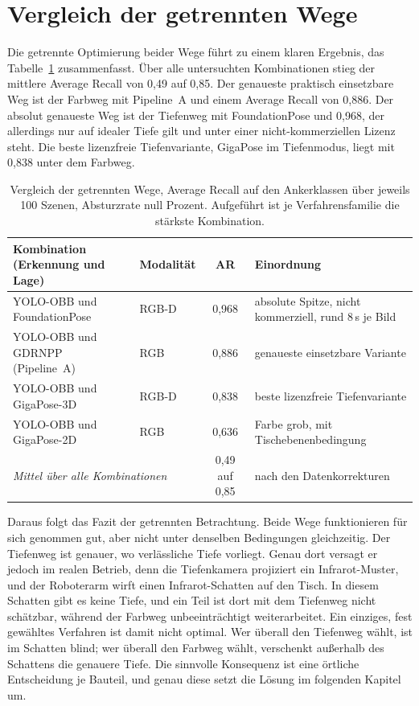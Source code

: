 \documentclass[oneside,studentpaper]{wbk}
\begin{document}
\section{Vergleich der getrennten Wege}
\label{sec:vergleich}

Die getrennte Optimierung beider Wege führt zu einem klaren Ergebnis, das
Tabelle~\ref{tab:getrennt} zusammenfasst. Über alle untersuchten Kombinationen
stieg der mittlere Average Recall von 0,49 auf 0,85. Der genaueste praktisch
einsetzbare Weg ist der Farbweg mit Pipeline~A und einem Average Recall von 0,886.
Der absolut genaueste Weg ist der Tiefenweg mit FoundationPose und 0,968, der
allerdings nur auf idealer Tiefe gilt und unter einer nicht-kommerziellen Lizenz
steht. Die beste lizenzfreie Tiefenvariante, GigaPose im Tiefenmodus, liegt mit
0,838 unter dem Farbweg.

\begin{table}[H]
\caption{Vergleich der getrennten Wege, Average Recall auf den Ankerklassen über
jeweils 100 Szenen, Absturzrate null Prozent. Aufgeführt ist je Verfahrensfamilie
die stärkste Kombination.}
\label{tab:getrennt}
\centering
\small
\begin{tabularx}{\textwidth}{l l c X}
\toprule
\textbf{Kombination (Erkennung und Lage)} & \textbf{Modalität} & \textbf{AR} & \textbf{Einordnung} \\
\midrule
YOLO-OBB und FoundationPose & RGB-D & 0,968 & absolute Spitze, nicht kommerziell, rund 8\,s je Bild \\
YOLO-OBB und GDRNPP (Pipeline~A) & RGB & 0,886 & genaueste einsetzbare Variante \\
YOLO-OBB und GigaPose-3D & RGB-D & 0,838 & beste lizenzfreie Tiefenvariante \\
YOLO-OBB und GigaPose-2D & RGB & 0,636 & Farbe grob, mit Tischebenenbedingung \\
\midrule
\multicolumn{2}{l}{\textit{Mittel über alle Kombinationen}} & 0,49 auf 0,85 & nach den Datenkorrekturen \\
\bottomrule
\end{tabularx}
\end{table}

Daraus folgt das Fazit der getrennten Betrachtung. Beide Wege funktionieren für
sich genommen gut, aber nicht unter denselben Bedingungen gleichzeitig. Der
Tiefenweg ist genauer, wo verlässliche Tiefe vorliegt. Genau dort versagt er
jedoch im realen Betrieb, denn die Tiefenkamera projiziert ein Infrarot-Muster,
und der Roboterarm wirft einen Infrarot-Schatten auf den Tisch. In diesem Schatten
gibt es keine Tiefe, und ein Teil ist dort mit dem Tiefenweg nicht schätzbar,
während der Farbweg unbeeinträchtigt weiterarbeitet. Ein einziges, fest gewähltes
Verfahren ist damit nicht optimal. Wer überall den Tiefenweg wählt, ist im
Schatten blind; wer überall den Farbweg wählt, verschenkt außerhalb des Schattens
die genauere Tiefe. Die sinnvolle Konsequenz ist eine örtliche Entscheidung je
Bauteil, und genau diese setzt die Lösung im folgenden Kapitel um.
\end{document}
